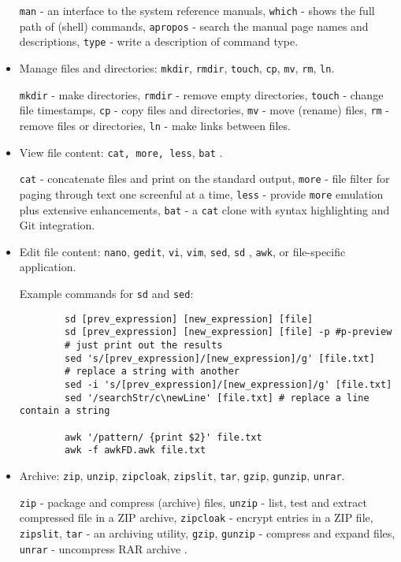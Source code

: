 \begin{itemize}
	\verb|man| - an interface to the system reference manuals, \verb|which| - shows the full path of (shell) commands, \verb|apropos| - search the manual page names and descriptions, \verb|type| - write a description of command type.
	
	\item Manage files and directories: \verb|mkdir|, \verb|rmdir|, \verb|touch|, \verb|cp|, \verb|mv|, \verb|rm|, \verb|ln|.
	
	\verb|mkdir| - make directories, \verb|rmdir| - remove empty directories, \verb|touch| - change file timestamps, \verb|cp| - copy files and directories, \verb|mv| - move (rename) files, \verb|rm| - remove files or directories, \verb|ln| - make links between files.
	
	\item View file content: \verb|cat, more, less|, \verb|bat| \cite{bat}.
	
	\verb|cat| - concatenate files and print on the standard output, \verb|more| - file filter for paging through text one screenful at a time, \verb|less| - provide \verb|more| emulation plus extensive enhancements, \verb|bat| - a \verb|cat| clone with syntax highlighting and Git integration.
	
	\item Edit file content: \verb|nano|, \verb|gedit|, \verb|vi|, \verb|vim|, \verb|sed|, \verb|sd| \cite{sd}, \verb|awk|, or file-specific application.
	
	Example commands for \texttt{sd} and \texttt{sed}:
	\begin{verbatim}
		sd [prev_expression] [new_expression] [file]
		sd [prev_expression] [new_expression] [file] -p #p-preview
		# just print out the results
		sed 's/[prev_expression]/[new_expression]/g' [file.txt]
		# replace a string with another
		sed -i 's/[prev_expression]/[new_expression]/g' [file.txt]
		sed '/searchStr/c\newLine' [file.txt] # replace a line contain a string
		
		awk '/pattern/ {print $2}' file.txt
		awk -f awkFD.awk file.txt
	\end{verbatim}
	
	\item Archive: \verb|zip|, \verb|unzip|, \verb|zipcloak|, \verb|zipslit|, \verb|tar|, \verb|gzip|, \verb|gunzip|, \verb|unrar|.
	
	\verb|zip| - package and compress (archive) files, \verb|unzip| - list, test and extract compressed file in a ZIP archive, \verb|zipcloak| - encrypt entries in a ZIP file, \verb|zipslit|, \verb|tar| - an archiving utility, \verb|gzip|, \verb|gunzip| - compress and expand files, \verb|unrar| - uncompress RAR archive .
	

\end{itemize}
